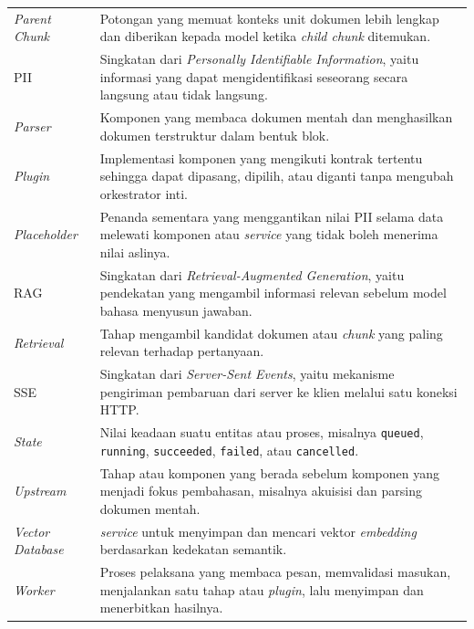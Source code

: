 \begin{longtable}{@{}>{\RaggedRight\arraybackslash}p{3.7cm}>{\RaggedRight\arraybackslash}p{\dimexpr\textwidth-3.7cm-2\tabcolsep\relax}@{}}
\textit{Parent Chunk} & Potongan yang memuat konteks unit dokumen lebih lengkap dan diberikan kepada model ketika \textit{child chunk} ditemukan. \\
PII & Singkatan dari \textit{Personally Identifiable Information}, yaitu informasi yang dapat mengidentifikasi seseorang secara langsung atau tidak langsung. \\
\textit{Parser} & Komponen yang membaca dokumen mentah dan menghasilkan dokumen terstruktur dalam bentuk blok. \\
\textit{Plugin} & Implementasi komponen yang mengikuti kontrak tertentu sehingga dapat dipasang, dipilih, atau diganti tanpa mengubah orkestrator inti. \\
\textit{Placeholder} & Penanda sementara yang menggantikan nilai PII selama data melewati komponen atau \emph{service} yang tidak boleh menerima nilai aslinya. \\
RAG & Singkatan dari \textit{Retrieval-Augmented Generation}, yaitu pendekatan yang mengambil informasi relevan sebelum model bahasa menyusun jawaban. \\
\textit{Retrieval} & Tahap mengambil kandidat dokumen atau \textit{chunk} yang paling relevan terhadap pertanyaan. \\
SSE & Singkatan dari \textit{Server-Sent Events}, yaitu mekanisme pengiriman pembaruan dari server ke klien melalui satu koneksi HTTP. \\
\textit{State} & Nilai keadaan suatu entitas atau proses, misalnya \texttt{queued}, \texttt{running}, \texttt{succeeded}, \texttt{failed}, atau \texttt{cancelled}. \\
\textit{Upstream} & Tahap atau komponen yang berada sebelum komponen yang menjadi fokus pembahasan, misalnya akuisisi dan parsing dokumen mentah. \\
\textit{Vector Database} & \emph{service} untuk menyimpan dan mencari vektor \textit{embedding} berdasarkan kedekatan semantik. \\
\textit{Worker} & Proses pelaksana yang membaca pesan, memvalidasi masukan, menjalankan satu tahap atau \textit{plugin}, lalu menyimpan dan menerbitkan hasilnya. \\
\bottomrule
\end{longtable}
\endgroup
